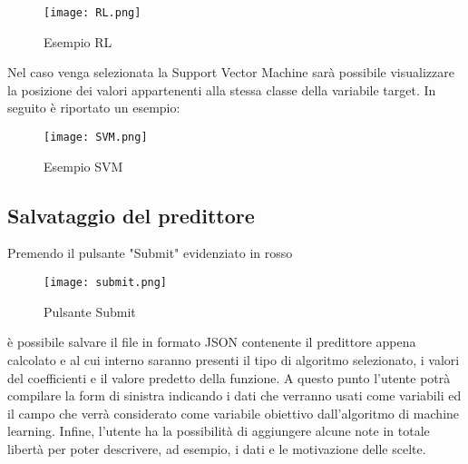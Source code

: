 \documentclass[../manuale-utente.tex]{subfiles}
\begin{document}
\begin{figure}[h!]
  \begin{center}
    \texttt{[image: RL.png]}\\
    \caption{Esempio RL}%
    \label{fig:RL}
  \end{center}
  \end{figure}


\newpage
Nel caso venga selezionata la Support Vector Machine sarà possibile visualizzare la posizione dei valori appartenenti alla stessa classe della variabile target. In seguito è riportato un esempio:

  \begin{figure}[h!]
    \begin{center}
      \texttt{[image: SVM.png]}\\
      \caption{Esempio SVM}%
      \label{fig:SVM}
    \end{center}
    \end{figure}

\newpage
\subsection{Salvataggio del predittore}
\label{subs:salvataggio-del-predittore}
Premendo il pulsante "Submit" evidenziato in rosso

\begin{figure}[h!]
  \begin{center}
    \texttt{[image: submit.png]}\\
    \caption{Pulsante Submit}%
    \label{fig:pulsante-submit}
  \end{center}
\end{figure}

è possibile salvare il file in formato JSON contenente il predittore appena calcolato e al cui interno saranno presenti il tipo di algoritmo selezionato, i valori del coefficienti e il valore predetto della funzione.
A questo punto l'utente potrà compilare la form di sinistra indicando i dati che verranno usati come variabili ed il campo che verrà considerato come variabile obiettivo dall'algoritmo di machine learning. Infine, l'utente ha la possibilità di aggiungere alcune note in totale libertà per poter descrivere, ad esempio, i dati e le motivazione delle scelte.
\end{document}
